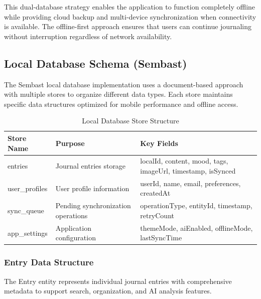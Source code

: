 This dual-database strategy enables the application to function completely offline while providing cloud backup and multi-device synchronization when connectivity is available. The offline-first approach ensures that users can continue journaling without interruption regardless of network availability.


\subsection{Local Database Schema (Sembast)}\label{subsec:local-schema}

The Sembast local database implementation uses a document-based approach with multiple stores to organize different data types. Each store maintains specific data structures optimized for mobile performance and offline access.

\begin{table}[H]
\centering
\caption{Local Database Store Structure}
\label{tab:local-db-stores}
\begin{tabular}{|p{3cm}|p{5cm}|p{6cm}|}
\hline
\textbf{Store Name} & \textbf{Purpose} & \textbf{Key Fields} \\
\hline
entries & Journal entries storage & localId, content, mood, tags, imageUrl, timestamp, isSynced \\
\hline
user\_profiles & User profile information & userId, name, email, preferences, createdAt \\
\hline
sync\_queue & Pending synchronization operations & operationType, entityId, timestamp, retryCount \\
\hline
app\_settings & Application configuration & themeMode, aiEnabled, offlineMode, lastSyncTime \\
\hline
\end{tabular}
\end{table}

\subsubsection{Entry Data Structure}

The Entry entity represents individual journal entries with comprehensive metadata to support search, organization, and AI analysis features.

